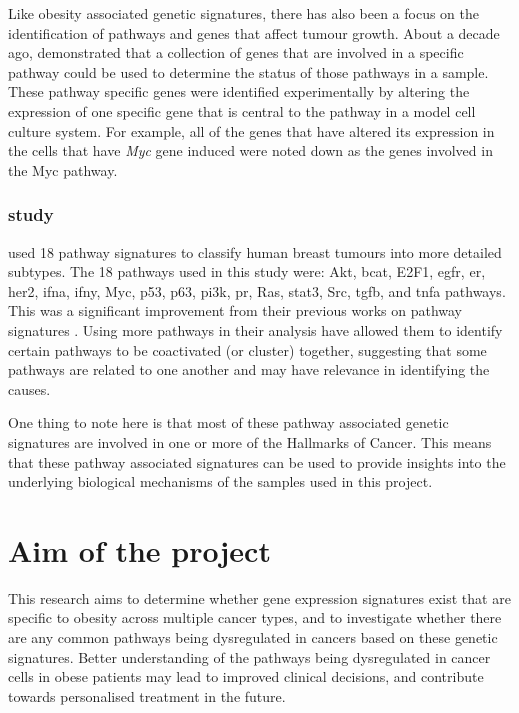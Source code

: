 Like obesity associated genetic signatures, there has also been a focus on the identification of pathways and genes that affect tumour growth.
About a decade ago, \citet{Bild2006} demonstrated that a collection of genes that are involved in a specific pathway could be used to determine the status of those pathways in a sample.
These pathway specific genes were identified experimentally by altering the expression of one specific gene that is central to the pathway in a model cell culture system.
For example, all of the genes that have altered its expression in the cells that have \textit{Myc} gene induced were noted down as the genes involved in the Myc pathway.

\subsubsection{\citet{Gatza2010a} study}
\label{ssub:gatza_study}

\citet{Gatza2010a} used 18 pathway signatures to classify human breast tumours into more detailed subtypes.
The 18 pathways used in this study were: Akt, \gls{bcat}, E2F1, \gls{egfr}, \gls{er}, \gls{her2}, \gls{ifna}, \gls{ifny}, Myc, p53, p63, \gls{pi3k}, \gls{pr}, Ras, \gls{stat3}, Src, \gls{tgfb}, and \gls{tnfa} pathways.
This was a significant improvement from their previous works on pathway signatures \citep{Bild2006,Bild2009}.
Using more pathways in their analysis have allowed them to identify certain pathways to be coactivated (or cluster) together, suggesting that some pathways are related to one another and may have relevance in identifying the causes.

One thing to note here is that most of these pathway associated genetic signatures are involved in one or more of the Hallmarks of Cancer.
This means that these pathway associated signatures can be used to provide insights into the underlying biological mechanisms of the samples used in this project.

\section{Aim of the project}
\label{sec:aim}

This research aims to determine whether gene expression signatures exist  that are specific to obesity across multiple cancer types, and to investigate whether there are any common pathways being dysregulated in cancers based on these genetic signatures.
Better understanding of the pathways being dysregulated in cancer cells in obese patients may lead to improved clinical decisions, and contribute towards personalised treatment in the future.

